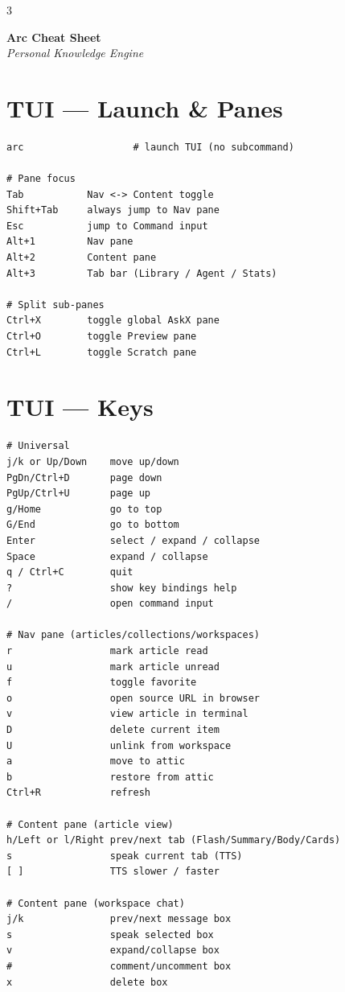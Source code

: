 \documentclass[10pt,a4paper,landscape]{article}
\begin{document}
\begin{multicols}{3}

{\large\bfseries Arc Cheat Sheet}\\
{\small\textit{Personal Knowledge Engine}}

\section{TUI — Launch \& Panes}

\begin{lstlisting}
arc                   # launch TUI (no subcommand)

# Pane focus
Tab           Nav <-> Content toggle
Shift+Tab     always jump to Nav pane
Esc           jump to Command input
Alt+1         Nav pane
Alt+2         Content pane
Alt+3         Tab bar (Library / Agent / Stats)

# Split sub-panes
Ctrl+X        toggle global AskX pane
Ctrl+O        toggle Preview pane
Ctrl+L        toggle Scratch pane
\end{lstlisting}

\section{TUI — Keys}

\begin{lstlisting}
# Universal
j/k or Up/Down    move up/down
PgDn/Ctrl+D       page down
PgUp/Ctrl+U       page up
g/Home            go to top
G/End             go to bottom
Enter             select / expand / collapse
Space             expand / collapse
q / Ctrl+C        quit
?                 show key bindings help
/                 open command input

# Nav pane (articles/collections/workspaces)
r                 mark article read
u                 mark article unread
f                 toggle favorite
o                 open source URL in browser
v                 view article in terminal
D                 delete current item
U                 unlink from workspace
a                 move to attic
b                 restore from attic
Ctrl+R            refresh

# Content pane (article view)
h/Left or l/Right prev/next tab (Flash/Summary/Body/Cards)
s                 speak current tab (TTS)
[ ]               TTS slower / faster

# Content pane (workspace chat)
j/k               prev/next message box
s                 speak selected box
v                 expand/collapse box
#                 comment/uncomment box
x                 delete box


\end{lstlisting}
\end{multicols}
\end{document}
